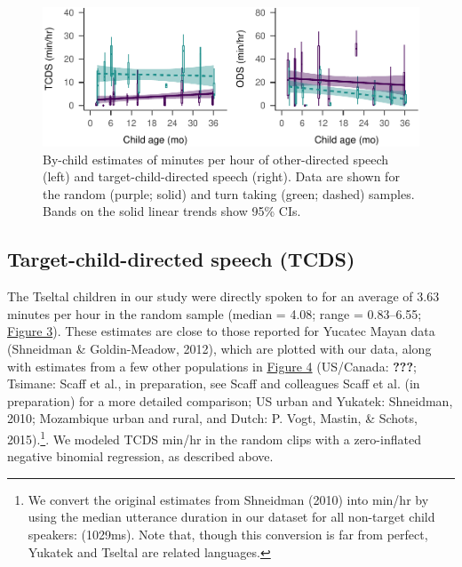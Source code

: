 \documentclass[floatsintext,man]{apa6}
\theoremstyle{definition}
\theoremstyle{definition}
\theoremstyle{definition}
\theoremstyle{remark}
\begin{document}
\begin{figure}
\centering
\includegraphics{Tseltal-CLE_files/figure-latex/fig3-1.pdf}
\caption{\label{fig:fig3}By-child estimates of minutes per hour of
other-directed speech (left) and target-child-directed speech (right).
Data are shown for the random (purple; solid) and turn taking (green;
dashed) samples. Bands on the solid linear trends show 95\% CIs.}
\end{figure}

\subsection{Target-child-directed speech
(TCDS)}\label{target-child-directed-speech-tcds}

The Tseltal children in our study were directly spoken to for an average
of 3.63 minutes per hour in the random sample (median = 4.08; range =
0.83--6.55; \protect\hyperlink{fig3}{Figure 3}). These estimates are
close to those reported for Yucatec Mayan data (Shneidman \&
Goldin-Meadow, 2012), which are plotted with our data, along with
estimates from a few other populations in
\protect\hyperlink{fig4}{Figure 4} (US/Canada: {\textbf{???}}; Tsimane:
Scaff et al., in preparation, see Scaff and colleagues Scaff et al. (in
preparation) for a more detailed comparison; US urban and Yukatek:
Shneidman, 2010; Mozambique urban and rural, and Dutch: P. Vogt, Mastin,
\& Schots, 2015).\footnote{We convert the original estimates from
  Shneidman (2010) into min/hr by using the median utterance duration in
  our dataset for all non-target child speakers: (1029ms). Note that,
  though this conversion is far from perfect, Yukatek and Tseltal are
  related languages.}. We modeled TCDS min/hr in the random clips with a
zero-inflated negative binomial regression, as described above.
\end{document}
